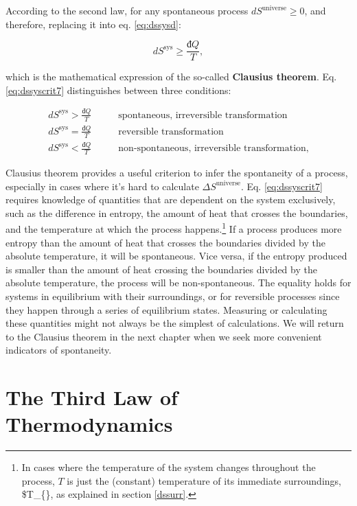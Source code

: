 \documentclass[
  9pt,
]{extbook}
\theoremstyle{definition}
\theoremstyle{definition}
\theoremstyle{definition}
\theoremstyle{remark}
\begin{document}
According to the second law, for any spontaneous process \(d S^{\mathrm{universe}}\geq0\), and therefore, replacing it into eq. \eqref{eq:dssysd}:

\begin{equation}
d S^{\mathrm{sys}} \geq \frac{đQ}{T},
\label{eq:dssyscrit7}
\end{equation}

which is the mathematical expression of the so-called \textbf{Clausius theorem}. Eq. \eqref{eq:dssyscrit7} distinguishes between three conditions:

\begin{equation}
\begin{aligned}
d S^{\mathrm{sys}} > \frac{đQ}{T} \qquad &\text{spontaneous, irreversible transformation} \\
d S^{\mathrm{sys}} = \frac{đQ}{T} \qquad &\text{reversible transformation} \\
d S^{\mathrm{sys}} < \frac{đQ}{T} \qquad &\text{non-spontaneous, irreversible transformation}, 
\end{aligned}
\label{eq:dssyscond}
\end{equation}

Clausius theorem provides a useful criterion to infer the spontaneity of a process, especially in cases where it's hard to calculate \(\Delta S^{\mathrm{universe}}\). Eq. \eqref{eq:dssyscrit7} requires knowledge of quantities that are dependent on the system exclusively, such as the difference in entropy, the amount of heat that crosses the boundaries, and the temperature at which the process happens.\footnote{In cases where the temperature of the system changes throughout the process, \(T\) is just the (constant) temperature of its immediate surroundings, \$T\_\{\}, as explained in section \ref{dssurr}.} If a process produces more entropy than the amount of heat that crosses the boundaries divided by the absolute temperature, it will be spontaneous. Vice versa, if the entropy produced is smaller than the amount of heat crossing the boundaries divided by the absolute temperature, the process will be non-spontaneous. The equality holds for systems in equilibrium with their surroundings, or for reversible processes since they happen through a series of equilibrium states. Measuring or calculating these quantities might not always be the simplest of calculations. We will return to the Clausius theorem in the next chapter when we seek more convenient indicators of spontaneity.

\hypertarget{thirdlawsect}{%
\section{The Third Law of Thermodynamics}\label{thirdlawsect}}
\end{document}

